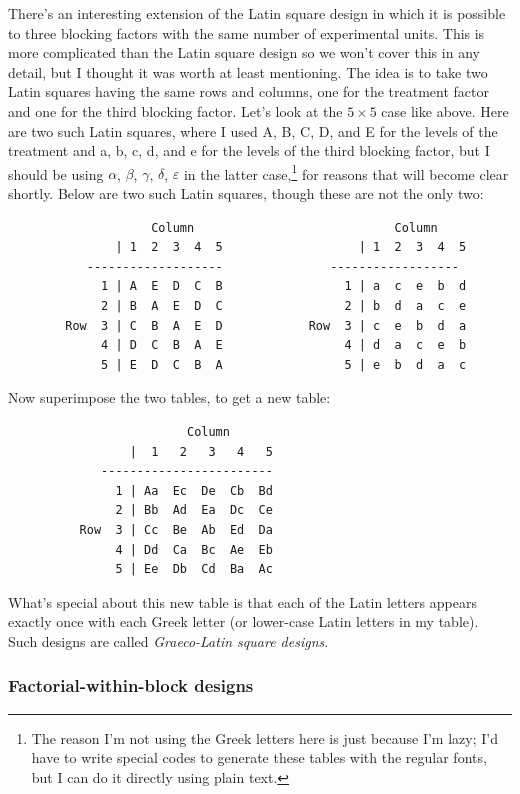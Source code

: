 \documentclass[a4paper, 12pt]{article}
\theoremstyle{plain}
\theoremstyle{definition}
\theoremstyle{remark}
\newcommand{\eps}{\varepsilon}
\begin{document}
There's an interesting extension of the Latin square design in which it is possible to three blocking factors with the same number of experimental units.  This is more complicated than the Latin square design so we won't cover this in any detail, but I thought it was worth at least mentioning.  The idea is to take two Latin squares having the same rows and columns, one for the treatment factor and one for the third blocking factor.  Let's look at the $5 \times 5$ case like above.  Here are two such Latin squares, where I used A, B, C, D, and E for the levels of the treatment and a, b, c, d, and e for the levels of the third blocking factor, but I should be using $\alpha$, $\beta$, $\gamma$, $\delta$, $\eps$ in the latter case,\footnote{The reason I'm not using the Greek letters here is just because I'm lazy; I'd have to write special codes to generate these tables with the regular fonts, but I can do it directly using plain text.} for reasons that will become clear shortly.  Below are two such Latin squares, though these are not the only two:
{\small
\begin{verbatim}
                    Column                            Column
               | 1  2  3  4  5                   | 1  2  3  4  5
           -------------------               ------------------
             1 | A  E  D  C  B                 1 | a  c  e  b  d
             2 | B  A  E  D  C                 2 | b  d  a  c  e
        Row  3 | C  B  A  E  D            Row  3 | c  e  b  d  a  
             4 | D  C  B  A  E                 4 | d  a  c  e  b
             5 | E  D  C  B  A                 5 | e  b  d  a  c
\end{verbatim}
}
Now superimpose the two tables, to get a new table:
{\small
\begin{verbatim}
                         Column 
                 |  1   2   3   4   5
             ------------------------
               1 | Aa  Ec  De  Cb  Bd
               2 | Bb  Ad  Ea  Dc  Ce
          Row  3 | Cc  Be  Ab  Ed  Da
               4 | Dd  Ca  Bc  Ae  Eb
               5 | Ee  Db  Cd  Ba  Ac
\end{verbatim}
}
What's special about this new table is that each of the Latin letters appears exactly once with each Greek letter (or lower-case Latin letters in my table).  Such designs are called {\em Graeco-Latin square designs}.  



\subsubsection*{Factorial-within-block designs}
\end{document}
